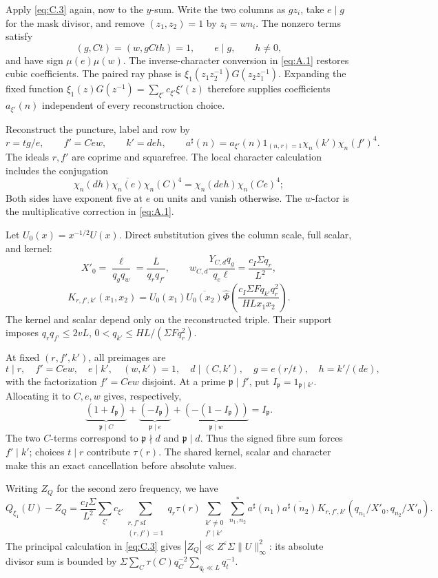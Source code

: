 \documentclass[11pt,a4paper]{article}
\begin{document}
Apply \eqref{eq:C.3} again, now to the \(y\)-sum. Write the two columns as \(gz_i\), take \(e\mid g\) for the mask divisor, and remove \((z_1,z_2)=1\) by \(z_i=wn_i\). The nonzero terms satisfy \[
(g,Ct)=(w,gCth)=1,\qquad e\mid g,\qquad h\ne0,
\] and have sign \(\mu(e)\mu(w)\). The inverse-character conversion in \eqref{eq:A.1} restores cubic coefficients. The paired ray phase is \(\xi_1(z_1z_2^{-1})G(z_2z_1^{-1})\). Expanding the fixed function \(\xi_1(z)G(z^{-1})=\sum_{\xi'}c_{\xi'}\xi'(z)\) therefore supplies coefficients \(a_{\xi'}(n)\) independent of every reconstruction choice.

Reconstruct the puncture, label and row by \[
r=tg/e,\qquad f'=Cew,\qquad k'=deh,
\qquad a^\sharp(n)=a_{\xi'}(n)1_{(n,r)=1}\chi_n(k')\chi_n(f')^4.
\tag{C.12}\label{eq:C.12}
\] The ideals \(r,f'\) are coprime and squarefree. The local character calculation includes the conjugation \[
\chi_n(dh)\overline{\chi_n(e)}\chi_n(C)^4
=\chi_n(deh)\chi_n(Ce)^4;
\tag{C.13}\label{eq:C.13}
\] Both sides have exponent five at \(e\) on units and vanish otherwise. The \(w\)-factor is the multiplicative correction in \eqref{eq:A.1}.

Let \(U_0(x)=x^{-1/2}U(x)\). Direct substitution gives the column scale, full scalar, and kernel: \[
X'_0=\frac\ell{q_gq_w}=\frac L{q_rq_{f'}},
\qquad w_{C,d}\frac{Y_{C,d}q_g}{q_e\ell}=\frac{c_I\Sigma q_r}{L^2},
\] \[
K_{r,f',k'}(x_1,x_2)=U_0(x_1)\overline{U_0(x_2)}
\widehat\Phi\!\left(\frac{c_I\Sigma Fq_{k'}q_r^2}{HLx_1x_2}\right).
\tag{C.14}\label{eq:C.14}
\] The kernel and scalar depend only on the reconstructed triple. Their support imposes \(q_rq_{f'}\le2vL\), \(0<q_{k'}\le HL/(\Sigma Fq_r^2)\).

At fixed \((r,f',k')\), all preimages are \[
t\mid r,\quad f'=Cew,\quad e\mid k',\quad(w,k')=1,
\quad d\mid(C,k'),\quad g=e(r/t),\quad h=k'/(de),
\] with the factorization \(f'=Cew\) disjoint. At a prime \(\mathfrak p\mid f'\), put \(I_{\mathfrak p}=1_{\mathfrak p\mid k'}\). Allocating it to \(C,e,w\) gives, respectively, \[
\underbrace{(1+I_{\mathfrak p})}_{\mathfrak p\mid C}
+\underbrace{(-I_{\mathfrak p})}_{\mathfrak p\mid e}
+\underbrace{(-(1-I_{\mathfrak p}))}_{\mathfrak p\mid w}
=I_{\mathfrak p}.
\tag{C.15}\label{eq:C.15}
\] The two \(C\)-terms correspond to \(\mathfrak p\nmid d\) and \(\mathfrak p\mid d\). Thus the signed fibre sum forces \(f'\mid k'\); choices \(t\mid r\) contribute \(\tau(r)\). The shared kernel, scalar and character make this an exact cancellation before absolute values.

Writing \(Z_Q\) for the second zero frequency, we have \[
Q_{\xi_1}(U)-Z_Q=
\frac{c_I\Sigma}{L^2}\sum_{\xi'}c_{\xi'}
\sum_{\substack{r,f'\ \mathrm{sf}\\(r,f')=1}}q_r\tau(r)
\sum_{\substack{k'\ne0\\f'\mid k'}}\sum_{n_1,n_2}^{*}
a^\sharp(n_1)\overline{a^\sharp(n_2)}
K_{r,f',k'}(q_{n_1}/X'_0,q_{n_2}/X'_0).
\tag{C.16}\label{eq:C.16}
\] The principal calculation in \eqref{eq:C.3} gives \(|Z_Q|\ll Z^\varepsilon\Sigma\|U\|_\infty^2\): its absolute divisor sum is bounded by \(\Sigma\sum_C\tau(C)q_C^{-2}\sum_{q_t\ll L}q_t^{-1}\).
\end{document}
